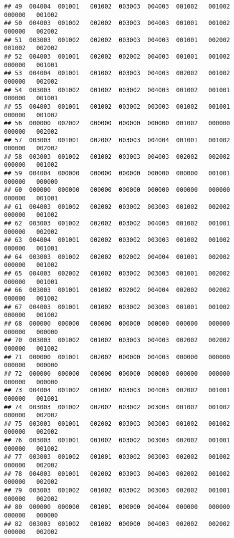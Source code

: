 \documentclass[
]{article}
\begin{document}
\begin{verbatim}
## 49  004004  001001   001002  003003  004003  001002   001002   000000   001002
## 50  004003  001002   002002  003003  004003  001001   001002   000000   002002
## 51  003003  001002   002002  003003  004003  001001   002002   001002   002002
## 52  004003  001001   002002  002002  004003  001001   001002   000000   001001
## 53  004004  001001   001002  003003  004003  002002   001002   000000   002002
## 54  003003  001002   001002  003002  004003  001002   001001   000000   001001
## 55  004003  001001   001002  003002  003003  001002   001001   000000   001002
## 56  000000  002002   000000  000000  000000  001002   000000   000000   002002
## 57  003003  001001   002002  003003  004004  001001   001002   000000   002002
## 58  003003  001002   001002  003003  004003  002002   002002   000000   001002
## 59  004004  000000   000000  000000  000000  000000   001001   000000   000000
## 60  000000  000000   000000  000000  000000  000000   000000   000000   001001
## 61  004003  001002   002002  003002  003003  001002   002002   000000   001002
## 62  003003  001002   002002  003002  004003  001002   001001   000000   002002
## 63  004004  001001   002002  003002  003003  001002   001002   000000   001001
## 64  003003  001002   002002  002002  004004  001001   002002   000000   001002
## 65  004003  002002   001002  003002  003003  001001   002002   000000   001001
## 66  003003  001001   001002  002002  004004  002002   002002   000000   001002
## 67  004003  001001   001002  003002  003003  001001   001002   000000   001002
## 68  000000  000000   000000  000000  000000  000000   000000   000000   000000
## 70  003003  001002   001002  003003  004003  002002   002002   000000   001002
## 71  000000  001001   002002  000000  004003  000000   000000   000000   000000
## 72  000000  000000   000000  000000  000000  000000   000000   000000   000000
## 73  004004  001002   001002  003003  004003  002002   001001   000000   001001
## 74  003003  001002   002002  003002  003003  001002   001002   000000   002002
## 75  003003  001001   002002  003003  003003  001002   001002   000000   002002
## 76  003003  001001   001002  003002  003003  002002   001001   000000   001002
## 77  003003  001002   001001  003002  003003  002002   001002   000000   002002
## 78  004003  001001   002002  003003  004003  002002   001002   000000   002002
## 79  003003  001002   001002  003002  003003  002002   001001   000000   002002
## 80  000000  000000   001001  000000  004004  000000   000000   000000   000000
## 82  003003  001002   001002  000000  004003  002002   002002   000000   002002

\end{verbatim}
\end{document}
